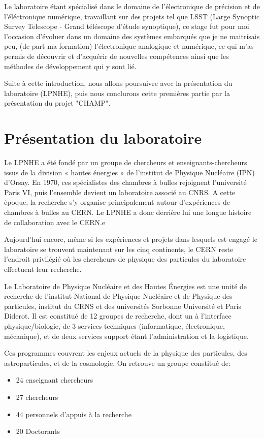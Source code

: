 \documentclass[french,a4paper,12pt]{report}
\begin{document}
Le laboratoire étant spécialisé dans le domaine de l'électronique de précision et de l'éléctronique numérique, travaillant sur des projets tel que LSST (Large Synoptic Survey Telescope - Grand téléscope d'étude synoptique), ce stage fut pour moi l'occasion d'évoluer dans un domaine des systèmes embarqués que je ne maitrisais peu, (de part ma formation) l'électronique analogique et numérique, ce qui m'as permis de découvrir et d'acquérir de nouvelles compétences ainsi que les méthodes de développement qui y sont lié.

Suite à cette introduction, nous allons poursuivre avec la présentation du laboratoire (LPNHE), puis nous conclurons cette premières partie par la présentation du projet "CHAMP".


  
	\chapter{Présentation du laboratoire}
  Le LPNHE a été fondé par un groupe de chercheurs et enseignants-chercheurs issus de la division « hautes énergies » de l’institut de Physique Nucléaire (IPN) d’Orsay. En 1970, ces spécialistes des chambres à bulles rejoignent l’université Paris VI, puis l’ensemble devient un laboratoire associé au CNRS. A cette époque, la recherche s’y organise principalement autour d’expériences de chambres à bulles au CERN. Le LPNHE a donc derrière lui une longue histoire de collaboration avec le CERN.e
  
  Aujourd’hui encore, même si les expériences et projets dans lesquels est engagé le laboratoire se trouvent maintenant sur les cinq continents, le CERN reste l’endroit privilégié où les chercheurs de physique des particules du laboratoire effectuent leur recherche.
  
  Le Laboratoire de Physique Nucléaire et des Hautes Énergies est une unité de recherche de l'institut National de Physique Nucléaire et de Physique des particules, institut du CRNS et des universités Sorbonne Université et Paris Diderot. Il est constitué de 12 groupes de recherche, dont un à l’interface physique/biologie, de 3 services techniques (informatique, électronique, mécanique), et de deux services support étant l'administration et la logistique.
  
  Ces programmes couvrent les enjeux actuels de la physique des particules, des astroparticules, et de la cosmologie.
  On retrouve un groupe constitué de:
  \begin{itemize}
  \item  24 enseignant chercheurs
  \item  27 chercheurs
  \item  44 personnels d'appuis à la recherche
  \item  20 Doctorants
  \end{itemize}
  \newpage
  
\end{document}
